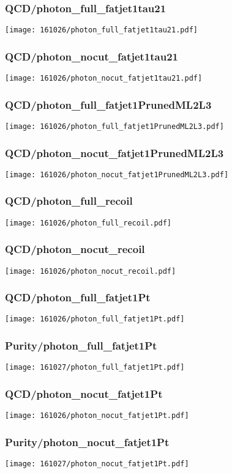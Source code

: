 \begin{frame}
   \frametitle{\small QCD/photon\_full\_fatjet1tau21}
   \centering
   \texttt{[image: 161026/photon\_full\_fatjet1tau21.pdf]}
\end{frame}

\begin{frame}
   \frametitle{\small QCD/photon\_nocut\_fatjet1tau21}
   \centering
   \texttt{[image: 161026/photon\_nocut\_fatjet1tau21.pdf]}
\end{frame}

\begin{frame}
   \frametitle{\small QCD/photon\_full\_fatjet1PrunedML2L3}
   \centering
   \texttt{[image: 161026/photon\_full\_fatjet1PrunedML2L3.pdf]}
\end{frame}

\begin{frame}
   \frametitle{\small QCD/photon\_nocut\_fatjet1PrunedML2L3}
   \centering
   \texttt{[image: 161026/photon\_nocut\_fatjet1PrunedML2L3.pdf]}
\end{frame}

\begin{frame}
   \frametitle{\small QCD/photon\_full\_recoil}
   \centering
   \texttt{[image: 161026/photon\_full\_recoil.pdf]}
\end{frame}

\begin{frame}
   \frametitle{\small QCD/photon\_nocut\_recoil}
   \centering
   \texttt{[image: 161026/photon\_nocut\_recoil.pdf]}
\end{frame}

\begin{frame}
   \frametitle{\small QCD/photon\_full\_fatjet1Pt}
   \centering
   \texttt{[image: 161026/photon\_full\_fatjet1Pt.pdf]}
\end{frame}

\begin{frame}
   \frametitle{\small Purity/photon\_full\_fatjet1Pt}
   \centering
   \texttt{[image: 161027/photon\_full\_fatjet1Pt.pdf]}
\end{frame}

\begin{frame}
   \frametitle{\small QCD/photon\_nocut\_fatjet1Pt}
   \centering
   \texttt{[image: 161026/photon\_nocut\_fatjet1Pt.pdf]}
\end{frame}

\begin{frame}
   \frametitle{\small Purity/photon\_nocut\_fatjet1Pt}
   \centering
   \texttt{[image: 161027/photon\_nocut\_fatjet1Pt.pdf]}
\end{frame}

